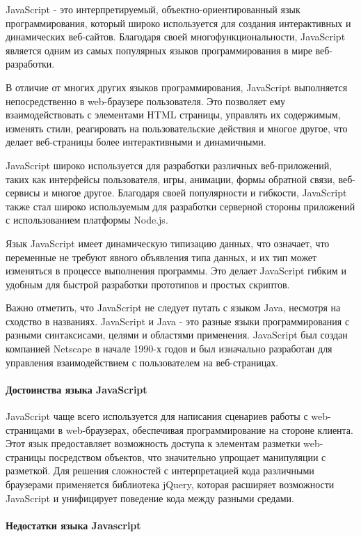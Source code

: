 JavaScript - это интерпретируемый, объектно-ориентированный язык программирования, который широко используется для создания интерактивных и динамических веб-сайтов. Благодаря своей многофункциональности, JavaScript является одним из самых популярных языков программирования в мире веб-разработки.

В отличие от многих других языков программирования, JavaScript выполняется непосредственно в web-браузере пользователя. Это позволяет ему взаимодействовать с элементами HTML страницы, управлять их содержимым, изменять стили, реагировать на пользовательские действия и многое другое, что делает веб-страницы более интерактивными и динамичными.

JavaScript широко используется для разработки различных веб-приложений, таких как интерфейсы пользователя, игры, анимации, формы обратной связи, веб-сервисы и многое другое. Благодаря своей популярности и гибкости, JavaScript также стал широко используемым для разработки серверной стороны приложений с использованием платформы Node.js.

Язык JavaScript имеет динамическую типизацию данных, что означает, что переменные не требуют явного объявления типа данных, и их тип может изменяться в процессе выполнения программы. Это делает JavaScript гибким и удобным для быстрой разработки прототипов и простых скриптов.

Важно отметить, что JavaScript не следует путать с языком Java, несмотря на сходство в названиях. JavaScript и Java - это разные языки программирования с разными синтаксисами, целями и областями применения. JavaScript был создан компанией Netscape в начале 1990-х годов и был изначально разработан для управления взаимодействием с пользователем на веб-страницах.

\paragraph{Достоинства языка JavaScript}

JavaScript чаще всего используется для написания сценариев работы с web-страницами в web-браузерах, обеспечивая программирование на стороне клиента. Этот язык предоставляет возможность доступа к элементам разметки web-страницы посредством объектов, что значительно упрощает манипуляции с разметкой. Для решения сложностей с интерпретацией кода различными браузерами применяется библиотека jQuery, которая расширяет возможности JavaScript и унифицирует поведение кода между разными средами.

\paragraph{Недостатки языка Javascript}

